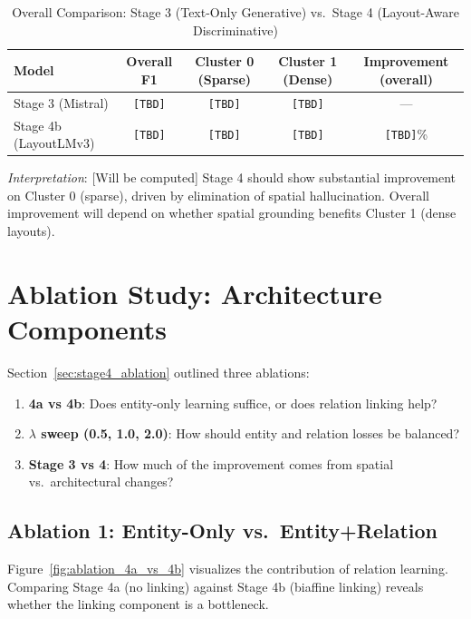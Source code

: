 \begin{table}[ht]
\centering
\caption{Overall Comparison: Stage 3 (Text-Only Generative) vs.\ Stage 4 (Layout-Aware Discriminative)}
\label{tab:stage3_vs_stage4_comparison}
\begin{tabular}{@{}lcccc@{}}
\toprule
\textbf{Model} & \textbf{Overall F1} & \textbf{Cluster 0 (Sparse)} & \textbf{Cluster 1 (Dense)} & \textbf{Improvement (overall)} \\
\midrule
Stage 3 (Mistral) & \texttt{[TBD]} & \texttt{[TBD]} & \texttt{[TBD]} & --- \\
Stage 4b (LayoutLMv3) & \texttt{[TBD]} & \texttt{[TBD]} & \texttt{[TBD]} & \texttt{[TBD]}\% \\
\bottomrule
\end{tabular}
\end{table}

\textit{Interpretation}: [Will be computed] Stage 4 should show substantial improvement on Cluster 0 (sparse), driven by elimination of spatial hallucination. Overall improvement will depend on whether spatial grounding benefits Cluster 1 (dense layouts).

\section{Ablation Study: Architecture Components}
\label{sec:ablation_results}

Section~\ref{sec:stage4_ablation} outlined three ablations:

\begin{enumerate}
    \item \textbf{4a vs 4b}: Does entity-only learning suffice, or does relation linking help?
    \item \textbf{$\lambda$ sweep (0.5, 1.0, 2.0)}: How should entity and relation losses be balanced?
    \item \textbf{Stage 3 vs 4}: How much of the improvement comes from spatial vs.\ architectural changes?
\end{enumerate}

\subsection{Ablation 1: Entity-Only vs.\ Entity+Relation}
\label{sec:ablation_entity_vs_relation}

Figure~\ref{fig:ablation_4a_vs_4b} visualizes the contribution of relation learning. Comparing Stage 4a (no linking) against Stage 4b (biaffine linking) reveals whether the linking component is a bottleneck.

